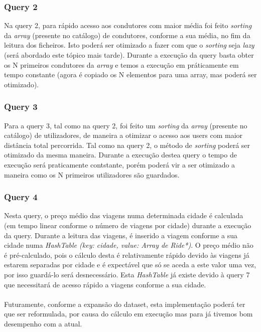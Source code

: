 \documentclass{article}
\begin{document}
        \subsubsection{Query 2}
            Na query 2, para rápido acesso aos condutores com maior média foi 
            feito \emph{sorting} da \emph{array} (presente no catálogo) de 
            condutores, conforme a sua média, no fim da leitura dos ficheiros.
            Isto poderá ser otimizado a fazer com que o \emph{sorting} seja
            \emph{lazy} (será abordado este tópico mais tarde).
            Durante a execução da query basta obter os N primeiros 
            condutores da \emph{array} e temos a execução em práticamente em
            tempo constante (agora é copiado os N elementos para uma array, mas
            poderá ser otimizado).
        \subsubsection{Query 3}
            Para a query 3, tal como na query 2, foi feito um \emph{sorting} da
            \emph{array} (presente no catálogo) de utilizadores, de maneira a 
            otimizar o acesso aos users com maior distância total percorrida.
            Tal como na query 2, o método de \emph{sorting} poderá ser otimizado
            da mesma maneira.
            Durante a execução destea query o tempo de execução será praticamente
            contstante, porém poderá vir a ser otimizado a maneira como os N
            primeiros utilizadores são guardados.        
        \subsubsection{Query 4}
            Nesta query, o preço médio das viagens numa determinada cidade é 
            calculada (em tempo linear conforme o número de viagens por cidade)
            durante a execução da query. Durante a leitura das viagens,
            é inserido a viagem conforme a sua cidade numa 
            \emph{HashTable (key: cidade, value: Array de Ride*)}. 
            O preço médio não é pré-calculado, pois o cálculo desta é 
            relativamente rápido devido às viagens já estarem separadas por cidade
            e é expectável que só se aceda a este valor uma vez, por isso
            guardá-lo será desnecessário.
            Esta \emph{HashTable} já existe devido à query 7 que necessitará de
            acesso rápido a viagens conforme a sua cidade. 
            \\
            \\Futuramente, conforme a expansão do dataset, esta implementação 
            poderá ter que ser reformulada, por causa do cálculo em execução mas
            para já tivemos bom desempenho com a atual.
        
\end{document}
